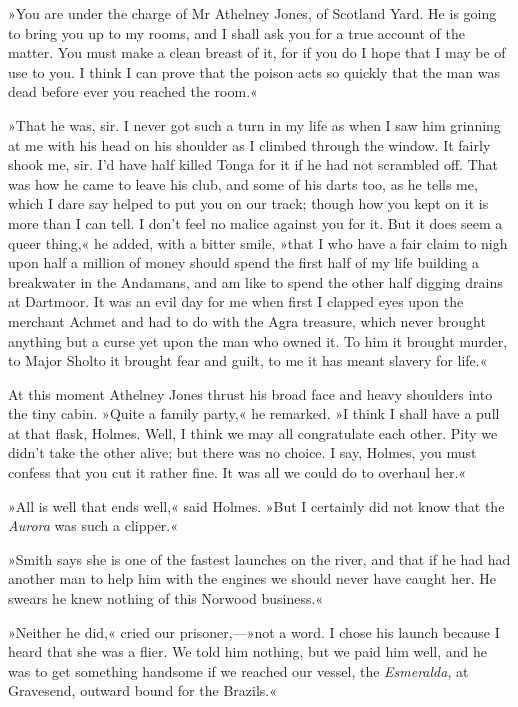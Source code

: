 »You are under the charge of Mr Athelney Jones, of Scotland Yard. He is going to bring you up to my rooms, and I shall ask you for a true account of the matter. You must make a clean breast of it, for if you do I hope that I may be of use to you. I think I can prove that the poison acts so quickly that the man was dead before ever you reached the room.«

»That he was, sir. I never got such a turn in my life as when I saw him grinning at me with his head on his shoulder as I climbed through the window. It fairly shook me, sir. I'd have half killed Tonga for it if he had not scrambled off. That was how he came to leave his club, and some of his darts too, as he tells me, which I dare say helped to put you on our track; though how you kept on it is more than I can tell. I don't feel no malice against you for it. But it does seem a queer thing,« he added, with a bitter smile, »that I who have a fair claim to nigh upon half a million of money should spend the first half of my life building a breakwater in the Andamans, and am like to spend the other half digging drains at Dartmoor. It was an evil day for me when first I clapped eyes upon the merchant Achmet and had to do with the Agra treasure, which never brought anything but a curse yet upon the man who owned it. To him it brought murder, to Major Sholto it brought fear and guilt, to me it has meant slavery for life.«

At this moment Athelney Jones thrust his broad face and heavy shoulders into the tiny cabin. »Quite a family party,« he remarked. »I think I shall have a pull at that flask, Holmes. Well, I think we may all congratulate each other. Pity we didn't take the other alive; but there was no choice. I say, Holmes, you must confess that you cut it rather fine. It was all we could do to overhaul her.«

»All is well that ends well,« said Holmes. »But I certainly did not know that the \textit{Aurora} was such a clipper.«

»Smith says she is one of the fastest launches on the river, and that if he had had another man to help him with the engines we should never have caught her. He swears he knew nothing of this Norwood business.«

»Neither he did,« cried our prisoner,—»not a word. I chose his launch because I heard that she was a flier. We told him nothing, but we paid him well, and he was to get something handsome if we reached our vessel, the \textit{Esmeralda}, at Gravesend, outward bound for the Brazils.«

